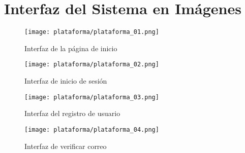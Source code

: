 

\appendices
\section{Interfaz del Sistema en Imágenes}

\begin{figure}[H]
    \centering
    \texttt{[image: plataforma/plataforma\_01.png]}
    \caption{Interfaz de la página de inicio}
    \label{fig:interfaz_sistema_pagina_inicio}
\end{figure}

\begin{figure}[H]
    \centering
    \texttt{[image: plataforma/plataforma\_02.png]}
    \caption{Interfaz de inicio de sesión}
    \label{fig:interfaz_sistema_inicio_sesión}
\end{figure}

\begin{figure}[H]
    \centering
    \texttt{[image: plataforma/plataforma\_03.png]}
    \caption{Interfaz del registro de usuario}
    \label{fig:interfaz_sistema_registro_usuario}
\end{figure}

\begin{figure}[H]
    \centering
    \texttt{[image: plataforma/plataforma\_04.png]}
    \caption{Interfaz de verificar correo}
    \label{fig:interfaz_sistema_verificar_correo}
\end{figure}

